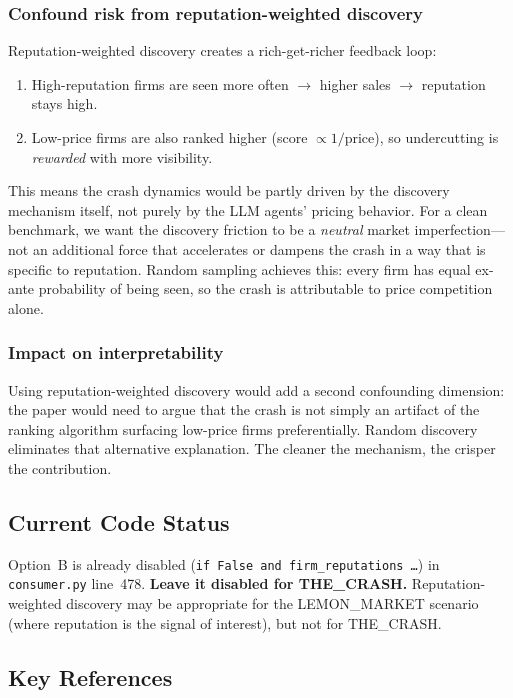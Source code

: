 \documentclass{article}
\begin{document}
\subsubsection{Confound risk from reputation-weighted discovery}

Reputation-weighted discovery creates a rich-get-richer feedback loop:
\begin{enumerate}
  \item High-reputation firms are seen more often $\to$ higher sales $\to$ reputation stays high.
  \item Low-price firms are also ranked higher (score $\propto 1/\text{price}$), so undercutting is \emph{rewarded} with more visibility.
\end{enumerate}
This means the crash dynamics would be partly driven by the discovery mechanism itself, not purely by the LLM agents' pricing behavior. For a clean benchmark, we want the discovery friction to be a \emph{neutral} market imperfection---not an additional force that accelerates or dampens the crash in a way that is specific to reputation. Random sampling achieves this: every firm has equal ex-ante probability of being seen, so the crash is attributable to price competition alone.

\subsubsection{Impact on interpretability}

Using reputation-weighted discovery would add a second confounding dimension: the paper would need to argue that the crash is not simply an artifact of the ranking algorithm surfacing low-price firms preferentially. Random discovery eliminates that alternative explanation. The cleaner the mechanism, the crisper the contribution.

\subsection{Current Code Status}

Option~B is already disabled (\texttt{if False and firm\_reputations \ldots}) in \texttt{consumer.py} line~478. \textbf{Leave it disabled for THE\_CRASH.} Reputation-weighted discovery may be appropriate for the LEMON\_MARKET scenario (where reputation is the signal of interest), but not for THE\_CRASH.

\subsection{Key References}
\end{document}
